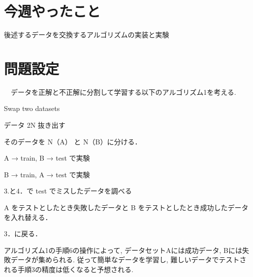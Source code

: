 \documentclass[twocolumn]{jarticle}     %
\begin{document}


\section{今週やったこと}
	\begin{itemize}{ %
			\item{後述するデータを交換するアルゴリズムの実装と実験}
	}\end{itemize}

\section{問題設定}

　データを正解と不正解に分割して学習する以下のアルゴリズム1を考える.

	\begin{algorithm}
		\caption{Swap two datasets}
		\label{alg1}
		\begin{enumerate}{ %
			\item{データ 2N 抜き出す}
			\item{そのデータを N（A） と N（B）に分ける．}
			\item{A → train, B → test で実験}
			\item{B → train, A → test で実験}
			\item{3.と4．で test でミスしたデータを調べる}
			\item{A をテストとしたとき失敗したデータと B をテストとしたとき成功したデータを入れ替える．}
			\item{3．に戻る．}
		}\end{enumerate}
	\end{algorithm}

	アルゴリズム1の手順6の操作によって, データセットAには成功データ, Bには失敗データが集められる.
	従って簡単なデータを学習し, 難しいデータでテストされる手順3の精度は低くなると予想される.
\end{document}
